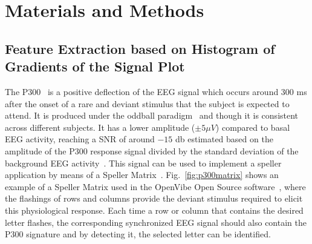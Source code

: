 \documentclass[entropy,article,submit,moreauthors,pdftex,10pt,a4paper]{mdpi}
\begin{document}
%
%
%
%
%
%
%
%

\section{Materials and Methods}

\subsection{Feature Extraction based on Histogram of Gradients of the Signal Plot} \label{Feature}

The P300~\citep{Farwell1988,Knuth2006} is a positive deflection of the EEG signal which occurs around $300$ ms after the onset of a rare and deviant stimulus that the subject is expected to attend.  It is produced under the oddball paradigm~\cite{WolpawJonathanR2012} and though it is consistent across different subjects. It has a lower amplitude  ($\pm 5 \mu V $) compared to basal EEG activity, reaching a SNR of around $-15$ db estimated based on the amplitude of the P300 response signal divided by the standard deviation of the background EEG activity~\citep{Hu2010}.  This signal can be used to implement a speller application by means of a Speller Matrix~\citep{Farwell1988}. Fig.~\ref{fig:p300matrix} shows an example of a Speller Matrix used in the OpenVibe Open Source software~\citep{Renard2010}, where the flashings of rows and columns provide the deviant stimulus required to elicit this physiological response.   Each time a row or column that contains the desired letter flashes, the corresponding synchronized EEG signal should also contain the P300 signature and by detecting it, the selected letter can be identified.
\end{document}
